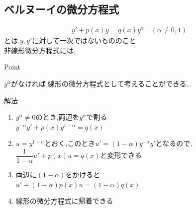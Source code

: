\documentclass[a4paper]{jsarticle}
\begin{document}
\subsection{ベルヌーイの微分方程式}
\begin{eqnarray*}
    y'+p\left(x\right)y=q\left(x\right)y^{\alpha}\quad\left(\alpha\neq 0,1\right)
\end{eqnarray*}
とは,$y,y'$に対して一次ではないもののこと\\
非線形微分方程式には,
\begin{itembox}[l]{Point}
    \begin{center}
        $y^{\alpha}$がなければ,線形の微分方程式として考えることができる\dots
    \end{center}
\end{itembox}
\begin{itembox}[l]{解法}
    \begin{enumerate}[(1)]
        \item $y^{\alpha}\neq 0$のとき,両辺を$y^{\alpha}$で割る\\
              $y^{-\alpha} y'+p\left(x\right)y^{1-\alpha}=q\left(x\right)$
        \item $u=y^{1-\alpha}$とおく,このとき$u'=\left(1-\alpha\right)y^{-\alpha}y'$となるので,\\
              $\dfrac{1}{1-\alpha}u'+p\left(x\right)u=q\left(x\right)$と変形できる
        \item 両辺に$\left(1-\alpha\right)$をかけると\\
              $u'+\left(1-\alpha\right)p\left(x\right)u=\left(1-\alpha\right)q\left(x\right)$
        \item 線形の微分方程式に帰着できる
    \end{enumerate}
\end{itembox}
\end{document}
